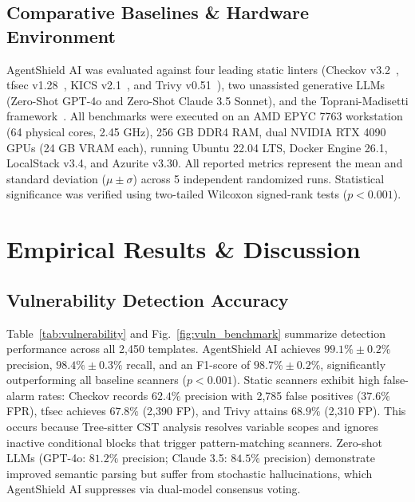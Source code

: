 \documentclass[runningheads]{llncs}
\begin{document}
\subsection{Comparative Baselines \& Hardware Environment}
AgentShield AI was evaluated against four leading static linters (Checkov v3.2~\cite{checkov2024}, tfsec v1.28~\cite{tfsec2023}, KICS v2.1~\cite{kics2022}, and Trivy v0.51~\cite{trivy2024}), two unassisted generative LLMs (Zero-Shot GPT-4o and Zero-Shot Claude 3.5 Sonnet), and the Toprani-Madisetti framework~\cite{toprani2025automated}. All benchmarks were executed on an AMD EPYC 7763 workstation (64 physical cores, 2.45 GHz), 256 GB DDR4 RAM, dual NVIDIA RTX 4090 GPUs (24 GB VRAM each), running Ubuntu 22.04 LTS, Docker Engine 26.1, LocalStack v3.4, and Azurite v3.30. All reported metrics represent the mean and standard deviation ($\mu \pm \sigma$) across 5 independent randomized runs. Statistical significance was verified using two-tailed Wilcoxon signed-rank tests ($p < 0.001$).


\section{Empirical Results \& Discussion}

\subsection{Vulnerability Detection Accuracy}
Table~\ref{tab:vulnerability} and Fig.~\ref{fig:vuln_benchmark} summarize detection performance across all 2,450 templates. AgentShield AI achieves $99.1\% \pm 0.2\%$ precision, $98.4\% \pm 0.3\%$ recall, and an F1-score of $98.7\% \pm 0.2\%$, significantly outperforming all baseline scanners ($p < 0.001$). Static scanners exhibit high false-alarm rates: Checkov records $62.4\%$ precision with 2,785 false positives ($37.6\%$ FPR), tfsec achieves $67.8\%$ (2,390 FP), and Trivy attains $68.9\%$ (2,310 FP). This occurs because Tree-sitter CST analysis resolves variable scopes and ignores inactive conditional blocks that trigger pattern-matching scanners. Zero-shot LLMs (GPT-4o: $81.2\%$ precision; Claude 3.5: $84.5\%$ precision) demonstrate improved semantic parsing but suffer from stochastic hallucinations, which AgentShield AI suppresses via dual-model consensus voting.
\end{document}
